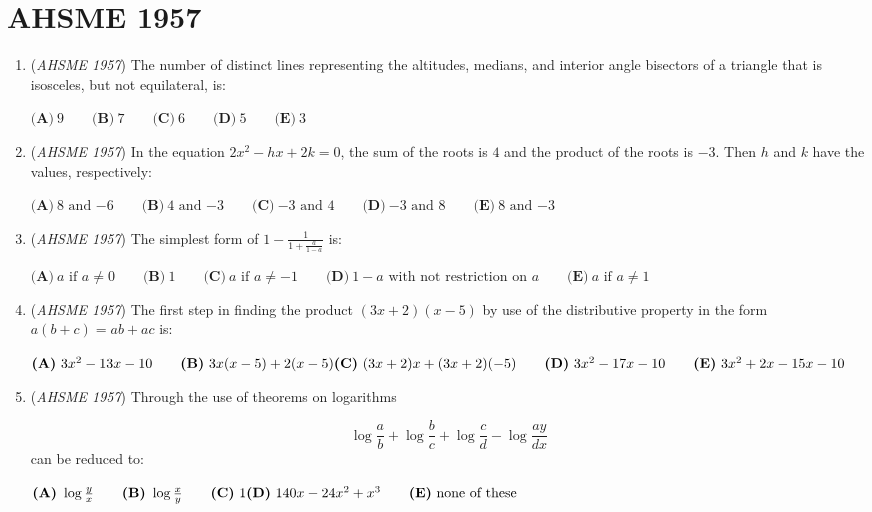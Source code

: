 \section{AHSME 1957}
        \begin{enumerate}
        	\item (\textit{AHSME 1957}) The number of distinct lines representing the altitudes, medians, and interior angle bisectors of a triangle that is isosceles, but not equilateral, is: 


 $\textbf{(A)}\ 9\qquad \textbf{(B)}\ 7\qquad \textbf{(C)}\ 6\qquad \textbf{(D)}\ 5\qquad \textbf{(E)}\ 3$


	\item (\textit{AHSME 1957}) In the equation $2x^2 - hx + 2k = 0$, the sum of the roots is $4$ and the product of the roots is $-3$. 
Then $h$ and $k$ have the values, respectively: 


 $\textbf{(A)}\ 8\text{ and }{-6} \qquad  \textbf{(B)}\ 4\text{ and }{-3}\qquad  \textbf{(C)}\ {-3}\text{ and }4\qquad \textbf{(D)}\ {-3}\text{ and }8\qquad \textbf{(E)}\ 8\text{ and }{-3}$


	\item (\textit{AHSME 1957}) The simplest form of $1 - \frac{1}{1 + \frac{a}{1 - a}}$ is: 


 $\textbf{(A)}\ {a}\text{ if }{a\not= 0} \qquad \textbf{(B)}\ 1\qquad  \textbf{(C)}\ {a}\text{ if }{a\not=-1}\qquad \textbf{(D)}\ {1-a}\text{ with not restriction on }{a}\qquad \textbf{(E)}\ {a}\text{ if }{a\not= 1}$


	\item (\textit{AHSME 1957}) The first step in finding the product $(3x + 2)(x - 5)$ by use of the distributive property in the form $a(b + c) = ab + ac$ is: 


 $\textbf{(A)}\ 3x^2 - 13x - 10 \qquad  \textbf{(B)}\ 3x(x - 5) + 2(x - 5)\qquad \\ \textbf{(C)}\ (3x+2)x+(3x+2)(-5)\qquad \textbf{(D)}\ 3x^2-17x-10\qquad \textbf{(E)}\ 3x^2+2x-15x-10$


	\item (\textit{AHSME 1957}) Through the use of theorems on logarithms 

 \[\log{\frac{a}{b}} + \log{\frac{b}{c}} + \log{\frac{c}{d}} - \log{\frac{ay}{dx}}\]
can be reduced to: 


 $\textbf{(A)}\ \log{\frac{y}{x}}\qquad  \textbf{(B)}\ \log{\frac{x}{y}}\qquad  \textbf{(C)}\ 1\qquad \\ \textbf{(D)}\ 140x-24x^2+x^3\qquad \textbf{(E)}\ \text{none of these}$



\end{enumerate}
